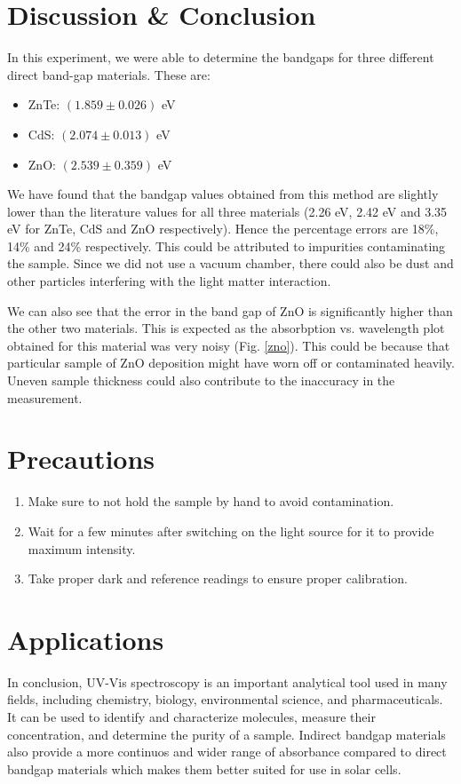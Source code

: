 \section{Discussion \& Conclusion}

In this experiment, we were able to determine the bandgaps for three different direct band-gap materials. These are:

\begin{itemize}
    \item ZnTe: $(1.859 \pm 0.026)$ eV
    \item CdS: $(2.074 \pm 0.013)$ eV
    \item ZnO: $(2.539 \pm 0.359)$ eV\\
\end{itemize}

We have found that the bandgap values obtained from this method are slightly lower than the literature values for all three materials (2.26 eV, 2.42 eV and 3.35 eV for ZnTe, CdS and ZnO respectively). Hence the percentage errors are 18\%, 14\% and 24\% respectively. This could be attributed to impurities contaminating the sample. Since we did not use a vacuum chamber, there could also be dust and other particles interfering with the light matter interaction.

We can also see that the error in the band gap of ZnO is significantly higher than the other two materials. This is expected as the absorbption vs. wavelength plot obtained for this material was very noisy (Fig. \ref{zno}). This could be because that particular sample of ZnO deposition might have worn off or contaminated heavily. Uneven sample thickness could also contribute to the inaccuracy in the measurement.

\section{Precautions}

    \begin{enumerate}
        \item Make sure to not hold the sample by hand to avoid contamination.
        \item Wait for a few minutes after switching on the light source for it to provide maximum intensity.
        \item Take proper dark and reference readings to ensure proper calibration.
    \end{enumerate}

\section{Applications}

In conclusion, UV-Vis spectroscopy is an important analytical tool used in many fields, including chemistry, biology, environmental science, and pharmaceuticals. It can be used to identify and characterize molecules, measure their concentration, and determine the purity of a sample. Indirect bandgap materials also provide a more continuos and wider range of absorbance compared to direct bandgap materials which makes them better suited for use in solar cells.